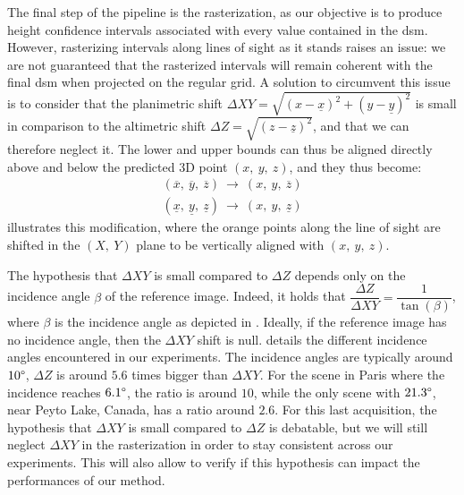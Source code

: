 The final step of the pipeline is the rasterization, as our objective is to produce height confidence intervals associated with every value contained in the \acrshort{dsm}. However, rasterizing intervals along lines of sight as it stands raises an issue: we are not guaranteed that the rasterized intervals will remain coherent with the final \acrshort{dsm} when projected on the regular grid. A solution to circumvent this issue is to consider that the planimetric shift $\Delta XY=\sqrt{(x-\underline{x})^2+(y-\underline{y})^2}$ is small in comparison to the altimetric shift $\Delta Z=\sqrt{(z-\underline{z})^2}$, and that we can therefore neglect it. The lower and upper bounds can thus be aligned directly above and below the predicted 3D point $(x, ~y, ~z)$, and they thus become:
\begin{align}
    (\overline{x}, ~\overline{y}, ~\overline{z}) ~\rightarrow~ (x, ~y, ~\overline{z})\\
    (\underline{x}, ~\underline{y}, ~\underline{z}) ~\rightarrow~ (x, ~y, ~\underline{z})
\end{align}
 illustrates this modification, where the orange points along the line of sight are shifted in the $(X,~Y)$ plane to be vertically aligned with $(x, ~y, ~z)$.
\begin{remark}
     The hypothesis that $\Delta XY$ is small compared to $\Delta Z$ depends only on the incidence angle $\beta$ of the reference image. Indeed, it holds that $\dfrac{\Delta Z}{\Delta XY}=\dfrac{1}{\tan(\beta)}$, where $\beta$ is the incidence angle as depicted in . Ideally, if the reference image has no incidence angle, then the $\Delta XY$ shift is null.  details the different incidence angles encountered in our experiments. The incidence angles are typically around $10\degree$, \ie $\Delta Z$ is around $5.6$ times bigger than $\Delta XY$. For the scene in Paris where the incidence reaches $6.1\degree$, the ratio is around $10$, while the only scene with $21.3\degree$, near Peyto Lake, Canada, has a ratio around $2.6$. For this last acquisition, the hypothesis that $\Delta XY$ is small compared to $\Delta Z$ is debatable, but we will still neglect $\Delta XY$ in the rasterization in order to stay consistent across our experiments. This will also allow to verify if this hypothesis can impact the performances of our method.
\end{remark}

